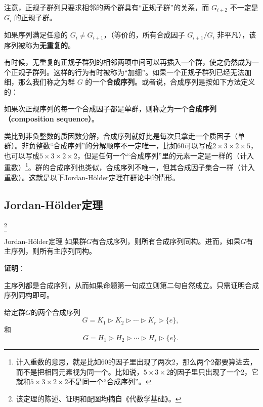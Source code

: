 注意，正规子群列只要求相邻的两个群具有“正规子群”的关系，而 $G_{i+2}$ 不一定是 $G_i$ 的正规子群。

如果序列满足任意的 $G_{i} \neq G_{i+1}$，（等价的，所有合成因子 $G_{i+1} / G_{i}$ 非平凡），该序列被称为\textbf{无重复的}。


有时候，无重复的正规子群列的相邻两项中间可以再插入一个群，使之仍然成为一个正规子群列。这样的行为有时被称为“加细”。如果一个正规子群列已经无法加细，那么我们称之为群 $G$ 的一个\textbf{合成序列}。或者说，合成序列是按如下方法定义的：

\begin{definition}{}

如果次正规序列的每一个合成因子都是单群，则称之为一个\textbf{合成序列（composition sequence）}。

\end{definition}


类比到非负整数的质因数分解，合成序列就好比是每次只拿走一个质因子（单群）。非负整数“合成序列”的分解顺序不一定唯一，比如$60$可以写成$2\times 3\times 2\times 5$，也可以写成$5\times 3\times 2\times 2$，但是任何一个“合成序列”里的元素一定是一样的（计入重数）\footnote{计入重数的意思，就是比如$60$的因子里出现了两次$2$，那么两个$2$都要算进去，而不是把相同元素视为同一个。比如说，$5\times 3 \times 2$的因子里只出现了一个$2$，它就和$5\times 3\times 2\times 2$不是同一个“合成序列”。}。群的合成序列也类似，合成序列不唯一，但其合成因子集合一样（计入重数）。这就是以下Jordan-Hölder定理在群论中的情形。






\subsection{Jordan-Hölder定理}\footnote{该定理的陈述、证明和配图均摘自《代数学基础》。}




\begin{theorem}{Jordan-Hölder定理}
如果群$G$有合成序列，则所有合成序列同构。进而，如果$G$有主序列，则所有主序列同构。
\end{theorem}


\textbf{证明}：

主序列都是合成序列，从而如果命题第一句成立则第二句自然成立。只需证明合成序列同构即可。

给定群$G$的两个合成序列
\begin{equation}
    G= K_1\rhd K_2\rhd \cdots \rhd K_r\rhd \{e\}, 
~\end{equation}
和
\begin{equation}
    G= H_1\rhd H_2\rhd \cdots \rhd H_s\rhd \{e\}. 
~\end{equation}



